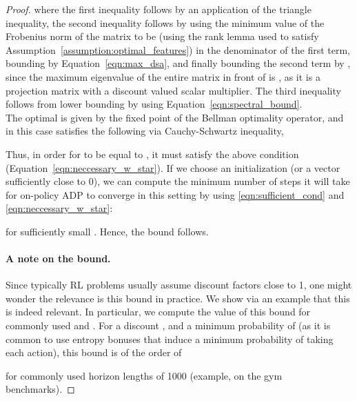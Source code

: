 \documentclass[jmlr]{article}
\begin{document}
\begin{proof}
where the first inequality follows by an application of the triangle inequality, the second inequality follows by using the minimum value of the Frobenius norm of the matrix  to be  (using the rank lemma used to satisfy Assumption~\ref{assumption:optimal_features}) in the denominator of the first term, bounding  by Equation~\ref{eqn:max_dsa}, and finally bounding the second term by , since the maximum eigenvalue of the entire matrix in front of  is , as it is a projection matrix with a discount  valued scalar multiplier. The third inequality follows from lower bounding  by  using Equation~\ref{eqn:spectral_bound}.\\

The optimal  is given by the fixed point of the Bellman optimality operator, and in this case satisfies the following via Cauchy-Schwartz inequality,

Thus, in order for  to be equal to , it must satisfy the above condition (Equation~\ref{eqn:neccessary_w_star}). If we choose an initialization  (or a vector sufficiently close to 0), we can compute the minimum number of steps it will take for on-policy ADP to converge in this setting by using \ref{eqn:sufficient_cond} and \ref{eqn:neccessary_w_star}:

for sufficiently small . Hence, the bound follows.

\paragraph{A note on the bound.} Since typically RL problems usually assume discount factors  close to 1, one might wonder the relevance is this bound in practice. We show via an example that this is indeed relevant. In particular, we compute the value of this bound for commonly used  and . For a discount , and a minimum probability of  (as it is common to use entropy bonuses that induce a minimum probability of taking each action), this bound is of the order of 

for commonly used horizon lengths of 1000 (example, on the gym benchmarks).
\end{proof}
\end{document}
